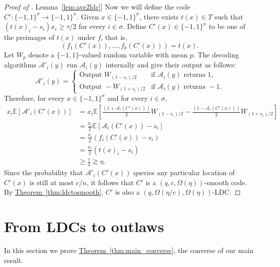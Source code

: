\documentclass[11pt]{article}
\numberwithin{equation}{section}
\theoremstyle{definition}
\theoremstyle{plain}
\newcommand{\expref}[2]{\hyperref[#2]{#1~\ref{#2}}}
\newcommand{\pmset}[1]{\{-1,1\}^{#1}} %
\newcommand{\sBC}{{\{-1,1\}}}
\newcommand{\E}{\mathbb{E}}
\newcommand{\cA}{{\mathcal A}}
\begin{document}
\begin{proof}[Proof of \expref{Lemma}{lem:ave2ldc}]
Now we will define the code $C':\sBC^\sigma \to \sBC^n$. Given $x\in \sBC^\sigma$, there exists $t(x)\in T$ such that $(t(x)_i-s_i)x_i\ge \tau/2$ for every $i\in \sigma$. Define $C'(x)\in \pmset{n}$ to be one of the preimages of $t(x)$ under $f$, that is,
 $$\left(f_1(C'(x)),\dots,f_k(C'(x))\right)=t(x).$$ Let $W_p$ denote a $\sBC$-valued random variable with mean $p$. The decoding algorithms $\cA'_i(y)$ run $\cA_i(y)$ internally and give their output as follows: 
\[
\cA'_i(y)=
\begin{cases}
\text{Output } W_{(1-s_i)/2} & \text{if }\cA_i(y) \text{ returns } 1,\\
\text{Output } -W_{(1+s_i)/2} & \text{if }\cA_i(y) \text{ returns } -1.
\end{cases}
\]
 Therefore, for every $x\in \pmset{\sigma}$ and for every $i\in \sigma$,
\begin{align*}
x_i\E[\cA'_i(C'(x))] &=x_i\E\left[\frac{(1+\cA_i(C'(x)))}{2}W_{(1-s_i)/2}-\frac{(1-\cA_i(C'(x)))}{2}W_{(1+s_i)/2}\right]\\
&=\frac{x_i}{2}\E\left[\cA_i(C'(x))-s_i\right]\\
&=\frac{x_i}{2}(f_i(C'(x))-s_i)\\
&=\frac{x_i}{2}(t(x)_i-s_i)\\
&\ge \frac{\tau}{4}\gtrsim \eta.
\end{align*}
Since the probability that $\cA'_i(C'(x))$ queries any particular location of $C'(x)$ is still at most $c/n$, it follows that $C'$ is a $(q,c,\Omega(\eta))$-smooth code. By \expref{Theorem}{thm:ldctosmooth}, $C'$ is also a $(q,\Omega(\eta/c),\Omega(\eta))$-LDC. 
  \end{proof}


%
\section{From LDCs to outlaws}
\label{sec:ldc2outlaw}

In this section we prove \expref{Theorem}{thm:main_converse}, the converse of our main result.
\end{document}
